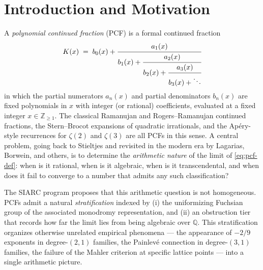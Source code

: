 \documentclass[11pt,a4paper]{article}
\theoremstyle{definition}
\theoremstyle{remark}
\newcommand{\Q}{\mathbb{Q}}
\newcommand{\Z}{\mathbb{Z}}
\begin{document}
\begin{abstract}
The v2.3 micro-bump (May 2026) extends the v2.2 amendment in two
narrow ways: (i) a \emph{sharper-bookkeeping pass} on the $d \geq 3$
caveat carried forward by the M8b V0 closure (Item~6 below), making
the caveat an explicit cross-reference to Open
Problem~\ref{prob:b4-allD} and adding a soft forward-pointer to the
in-preparation higher-Painlev\'e / Birkhoff--Trjitzinsky /
modular-form cross-validation extension programs (working tag:
\emph{Frontier decision packet}, pending Q-frontier-1 commitment);
and (ii) a \emph{picture-chain fold} (new Item~7 below)
recording the picture-chain v1.20+ governance-tier substrate
(bridge SHA \texttt{b9aa881}, cascade-132 PATH$_{\mathrm{B}}$
Option~$\alpha$ third realization) as the operator-runbook /
outlook companion to the umbrella v2.2 + PCF-2 v1.4 substrate-prep
fires. \emph{No mathematical content, conjecture, open problem, or
cross-degree triple of \S\ref{sec:triple} is modified by v2.3};
the v2.3 micro-bump is a sharper-bookkeeping + cross-document
propagation pass, not a content revision.
\end{abstract}

\tableofcontents

\section{Introduction and Motivation}
\label{sec:intro}

A \emph{polynomial continued fraction} (PCF) is a formal continued fraction
\begin{equation}
  \label{eq:pcf-def}
  K(x) \;=\; b_0(x) + \cfrac{a_1(x)}{b_1(x) + \cfrac{a_2(x)}{b_2(x) + \cfrac{a_3(x)}{b_3(x) + \ddots}}}
\end{equation}
in which the partial numerators $a_n(x)$ and partial denominators $b_n(x)$
are fixed polynomials in $x$ with integer (or rational) coefficients, evaluated
at a fixed integer $x \in \Z_{\geq 1}$. The classical Ramanujan and
Rogers--Ramanujan continued fractions, the Stern--Brocot expansions of
quadratic irrationals, and the Apéry-style recurrences for $\zeta(2)$ and
$\zeta(3)$ are all PCFs in this sense. A central problem, going back to
Stieltjes and revisited in the modern era by Lagarias, Borwein, and others,
is to determine the \emph{arithmetic nature} of the limit of \eqref{eq:pcf-def}:
when is it rational, when is it algebraic, when is it transcendental, and
when does it fail to converge to a number that admits any such classification?

The SIARC program proposes that this arithmetic question is not
homogeneous. PCFs admit a natural \emph{stratification} indexed by
(i) the uniformizing Fuchsian group of the associated monodromy
representation, and (ii) an obstruction tier that records how far the
limit lies from being algebraic over $\Q$. This stratification organizes
otherwise unrelated empirical phenomena --- the appearance of $-2/9$
exponents in degree-$(2,1)$ families, the Painlevé connection in
degree-$(3,1)$ families, the failure of the Mahler criterion at
specific lattice points --- into a single arithmetic picture.
\end{document}
